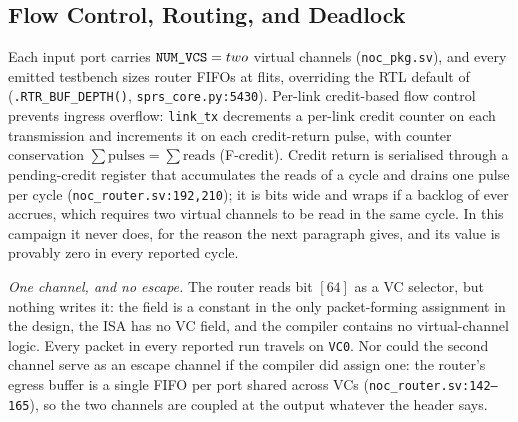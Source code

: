 \documentclass[journal,10pt]{IEEEtran}
\theoremstyle{plain}
\theoremstyle{definition}
\theoremstyle{remark}
\newcommand{\sv}[1]{\texttt{#1}}
\begin{document}
\subsection{Flow Control, Routing, and Deadlock}\label{sec:noc-route}

Each input port carries $\sv{NUM\_VCS} = \NumVcs{}$ virtual channels
(\sv{noc\_pkg.sv}), and every emitted testbench sizes router FIFOs at
\BufDepthSim{} flits, overriding the RTL default of \BufDepthRtl{}
(\sv{.RTR\_BUF\_DEPTH(\BufDepthSim)}, \sv{sprs\_core.py:5430}). Per-link
credit-based flow control prevents ingress overflow: \sv{link\_tx}
decrements a per-link credit counter on each transmission and increments it
on each credit-return pulse, with counter conservation $\sum \text{pulses} =
\sum \text{reads}$ (\textsf{F-credit}). Credit return is serialised through a
pending-credit register that accumulates the reads of a cycle and drains one
pulse per cycle (\sv{noc\_router.sv:192,210}); it is \CreditCtrBits{} bits
wide and wraps if a backlog of \CreditCtrWrap{} ever accrues, which requires
two virtual channels to be read in the same cycle. In this campaign it never
does, for the reason the next paragraph gives, and its value is provably
zero in every reported cycle.

\emph{One channel, and no escape.} The router reads bit $[64]$ as a VC
selector, but nothing writes it: the field is a constant in the only
packet-forming assignment in the design, the ISA has no VC field, and the
compiler contains no virtual-channel logic. Every packet in every reported
run travels on \sv{VC0}. Nor could the second channel serve as an escape
channel if the compiler did assign one: the router's egress buffer is a
single FIFO per port shared across VCs (\sv{noc\_router.sv:142--165}), so the
two channels are coupled at the output whatever the header says.
\end{document}
